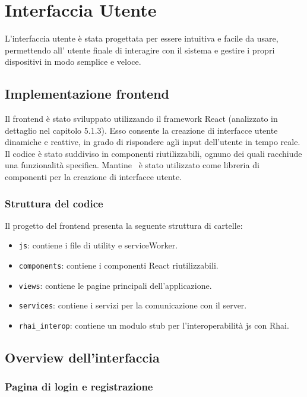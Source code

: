 \chapter{Interfaccia Utente}

L’interfaccia utente è stata progettata per essere intuitiva e facile da usare, permettendo all' utente
finale di interagire con il sistema e gestire i propri dispositivi in modo
semplice e veloce.

\section{Implementazione frontend}

Il frontend è stato sviluppato utilizzando il framework React (analizzato in dettaglio nel capitolo 5.1.3).
Esso consente la creazione di interfacce utente dinamiche e reattive, 
in grado di rispondere agli input dell'utente in tempo reale.
Il codice è stato suddiviso in componenti riutilizzabili, ognuno dei quali
racchiude una funzionalità specifica.
Mantine~\cite{mantine_website} è stato utilizzato come libreria di componenti per la creazione di interfacce utente.

\subsection{Struttura del codice}

Il progetto del frontend presenta la seguente struttura di cartelle:

\begin{itemize}
    \item \texttt{js}: contiene i file di utility e serviceWorker.
    \item \texttt{components}: contiene i componenti React riutilizzabili.
    \item \texttt{views}: contiene le pagine principali dell'applicazione.
    \item \texttt{services}: contiene i servizi per la comunicazione con il server.
    \item \texttt{rhai\_interop}: contiene un modulo stub per l'interoperabilità js con Rhai.
\end{itemize}

\section{Overview dell'interfaccia}

\subsection{Pagina di login e registrazione}

